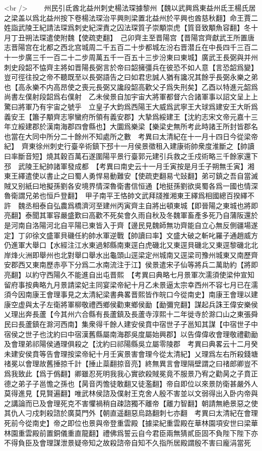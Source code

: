 <br />
　　州民引氐酋北益州刺史楊法琛據黎州【魏以武興爲東益州氐王楊氏居之梁盖以爲北益州按下卷楊法琛治平興則梁置北益州於平興也酋慈秋翻】命王賈二姓詣武陵王紀請法琛爲刺史紀深責之囚法琛質子崇顒崇虎【質音致顒魚容翻】冬十月丁丑朔法琛遣使附魏【使疏吏翻】　己卯齊主至晋陽宫【晋陽宫齊獻武王所置唐志晋陽宫在北都之西北宫城周二千五百二十步都城左汾右晋潜丘在中長四千三百二十一步廣三千一百二十二步周萬五千一百五十三步汾東曰東城】廣武王長弼與并州刺史段韶不恊齊主將如晋陽長弼言於帝曰韶擁彊兵在彼恐不如人意【言恐韶爲變】豈可徑往投之帝不聽既至以長弼語告之曰如君忠誠人猶有讒况其餘乎長弼永樂之弟也【高永樂不内高昂使之喪元長弼又讒段韶高歡父子爲失刑矣】乙酉以特進元韶爲尚書左僕射段韶爲右僕射　乙未侯景自加宇宙大將軍都督六合諸軍事以詔文呈上上驚曰將軍乃有宇宙之號乎　立皇子大鈞爲西陽王大威爲武寧王大球爲建安王大昕爲義安王【簫子顒齊志寧蠻府所領有義安郡】大摯爲綏建王【沈約志宋文帝元嘉十三年立綏建郡於漢南海郡四會縣也】大圜爲樂梁【樂梁史無所考此時諸王所封皆郡名也當在大同中所分二十餘州不知處所之數　考異曰太清紀在十一月十四日今從梁帝紀】　齊東徐州刺史行臺辛術鎮下邳十一月侯景徵租入建康術帥衆度淮斷之【帥讀曰率斷音短】燒其穀百萬石遂圍陽平景行臺郭元建引兵救之壬戍術略三千餘家還下邳　武陵王紀帥諸軍發成都　【考異曰南史云十一月壬寅按是月壬子朔無壬寅】湘東王繹遣使以書止之曰蜀人勇悍易動難安【使疏吏翻易弋䜴翻】弟可鎮之吾自當滅賊又别紙曰地擬孫劉各安境界情深魯衛書信恒通【地挺孫劉欲吳蜀各爲一國也情深魯衛謂兄弟也恒戶登翻】　甲子南平王恪帥文武拜牋推湘東王繹爲相國總百揆繹不許　魏丞相泰自弘農爲橋濟河至建州丙寅齊主自將出頓東城【即晉陽之東城也將即亮翻】泰聞其軍容嚴盛歎曰高歡不死矣會久雨自秋及冬魏軍畜產多死乃自蒲阪還於是河南自洛陽河北自平陽已東皆入于齊【邊民見魏師無功齊能自立心無反側疆場遂定】丁卯徐文盛軍貝磯任約帥水軍逆戰【帥讀曰率】文盛大破之斬叱羅子通趙威方仍進軍大舉口【水經注江水東過邾縣南東逕白虎磯北又東逕貝磯北又東逕黎磯北北岸烽火洲即舉州也北對舉口舉水出龜頭山逕梁定州城南又逕梁司豫州城東又南歷齊安郡西又東南歷赤亭下分爲二水南流注于江】侯景遣宋子仙等將兵二萬助約【將即亮翻】以約守西陽久不能進自出屯晋熙　【考異曰典略七月景軍次濡須使梁仲宣知留府事按典略九月景請梁妃主同宴梁帝紀十月乙未景逼太宗幸西州不容七月已在濡須今因南康王會理事見之太清紀梁書典畧晋熙皆作皖口今從南史】南康王會理以建康空虚與太子左衛將軍柳敬禮西鄉侯勸東鄉侯勔【勔彌兖翻】謀起兵誅王偉安樂侯乂理出奔長蘆【今其州六合縣有長蘆鎮及長蘆寺淳熙十二年徙寺於滁口山之東張舜民曰長蘆鎮在滁河西南】集衆得千餘人建安侯賁中宿世子子邕知其謀【中宿世子中宿侯之世子也沈約曰中宿漢舊縣屬南海郡吳度屬始興郡】以告偉偉收會理敬禮勸勔及會理弟祁陽侯通理俱殺之【沈約曰祁陽縣吳立屬零陵郡　考異曰典畧云十二月癸未建安侯賁等告會理按梁帝紀十月壬寅景害會理今從太清紀】乂理爲左右所殺錢塘禇冕以會理故舊捶掠千計【捶止蘂翻掠音亮】終無異言會理隔壁謂之曰禇郎卿豈不爲我致此【爲于僞翻】卿雖忍死明我我心實欲殺賊冕竟不服景乃宥之勸昺之子賁正德之弟子子邕憺之孫也【昺音丙憺徒敢翻又徒濫翻】帝自即位以來景防衛甚嚴外人莫得進見【見賢遍翻】唯武林侯諮及僕射王克舍人殷不害並以文弱得出入卧内帝與之講論而已及會理死克不害懼禍稍自疎諮獨不離帝【離力智翻】朝請無絶景惡之使其仇人刁戍刺殺諮於廣莫門外【朝直遥翻惡烏路翻刺七亦翻　考異曰太清紀在會理死前今從南史】帝之即位也景與帝登重雲殿【據梁紀重雲殿在華林園項安世曰梁華林園重雲殿前置銅儀重直龍翻】禮佛爲誓云自今君臣兩無猜貳臣固不負陛下陛下亦不得負臣及會理謀泄景疑帝知之故殺諮帝自知不久指所居殿謂殷不害曰龐涓當死